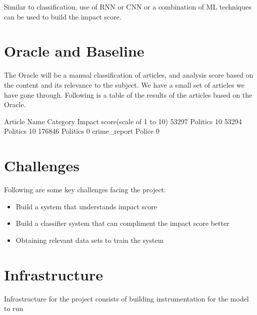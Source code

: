 \documentclass{article}
\begin{document}
Similar to classification, use of RNN or CNN or a combination of ML techniques can be used to build the impact score.

\section*{Oracle and Baseline} %

The Oracle will be a manual classification of articles, and analysis score based on the content and its relevance to the subject.
We have a small set of articles we have gone through.
Following is a table of the results of the articles based on the Oracle.

Article Name    Category    Impact score(scale of 1 to 10)
53297           Politics    10
53294           Politics    10
176846          Politics    0
crime_report    Police      0



\section*{Challenges} %

Following are some key challenges facing the project:
\begin{itemize}
	\item Build a system that understands impact score
	\item Build a classifier system that can compliment the impact score better
	\item Obtaining relevant data sets to train the system
\end{itemize}

 

\section*{Infrastructure} %
Infrastructure for the project consists of building instrumentation for the model to run
\end{document}
